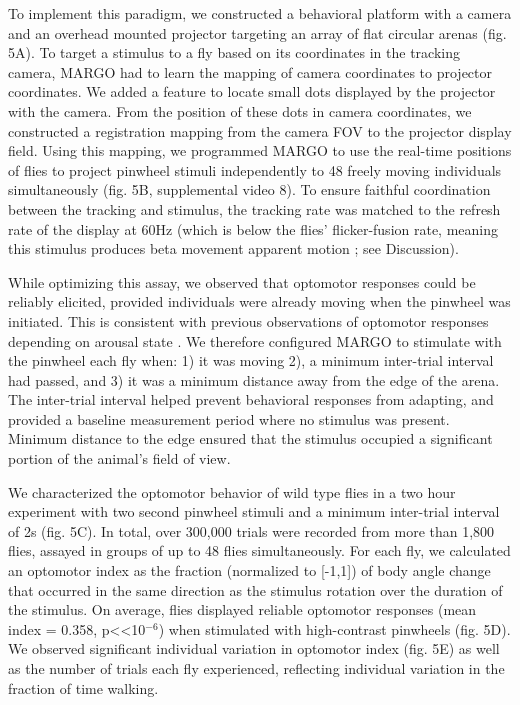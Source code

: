 \documentclass[10pt]{article}
\begin{document}
\begin{multicols}{2}
To implement this paradigm, we constructed a behavioral platform with a camera and an overhead mounted projector targeting an array of flat circular arenas (fig. 5A). To target a stimulus to a fly based on its coordinates in the tracking camera, MARGO had to learn the mapping of camera coordinates to projector coordinates. We added a feature to locate small dots displayed by the projector with the camera. From the position of these dots in camera coordinates, we constructed a registration mapping from the camera FOV to the projector display field. Using this mapping, we programmed MARGO to use the real-time positions of flies to project pinwheel stimuli independently to 48 freely moving individuals simultaneously (fig. 5B, supplemental video 8). To ensure faithful coordination between the tracking and stimulus, the tracking rate was matched to the refresh rate of the display at 60Hz (which is below the flies' flicker-fusion rate, meaning this stimulus produces beta movement apparent motion \citep{haag_arenz_serbe_gabbiani_borst_2016}; see Discussion). 

While optimizing this assay, we observed that optomotor responses could be reliably elicited, provided individuals were already moving when the pinwheel was initiated. This is consistent with previous observations of optomotor responses depending on arousal state \citep{Zhu_Peripheral_2009,Kim_Fly_2016}. We therefore configured MARGO to stimulate with the pinwheel each fly when: 1) it was moving 2), a minimum inter-trial interval had passed, and 3) it was a minimum distance away from the edge of the arena. The inter-trial interval helped prevent behavioral responses from adapting, and provided a baseline measurement period where no stimulus was present. Minimum distance to the edge ensured that the stimulus occupied a significant portion of the animal's field of view. 

We characterized the optomotor behavior of wild type flies in a two hour experiment with two second pinwheel stimuli and a minimum inter-trial interval of 2s (fig. 5C). In total, over 300,000 trials were recorded from more than 1,800 flies, assayed in groups of up to 48 flies simultaneously. For each fly, we calculated an optomotor index \citep{Seelig_Two_2010} as the fraction (normalized to [-1,1]) of body angle change that occurred in the same direction as the stimulus rotation over the duration of the stimulus. On average, flies displayed reliable optomotor responses (mean index = 0.358, p<<10$^{-6}$) when stimulated with high-contrast pinwheels (fig. 5D). We observed significant individual variation in optomotor index (fig. 5E) as well as the number of trials each fly experienced, reflecting individual variation in the fraction of time walking. 


\end{multicols}
\end{document}
